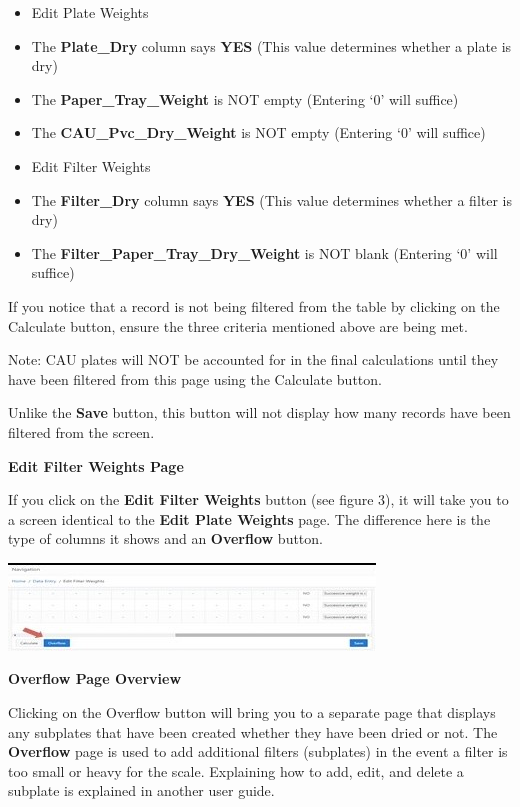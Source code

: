 \documentclass[
]{book}
\begin{document}
\begin{itemize}
\item
  Edit Plate Weights\\
\item
  The \textbf{Plate\_Dry} column says \textbf{YES} (This value determines whether a plate is dry)\\
\item
  The \textbf{Paper\_Tray\_Weight} is NOT empty (Entering `0' will suffice)\\
\item
  The \textbf{CAU\_Pvc\_Dry\_Weight} is NOT empty (Entering `0' will suffice)
\item
  Edit Filter Weights\\
\item
  The \textbf{Filter\_Dry} column says \textbf{YES} (This value determines whether a filter is dry)\\
\item
  The \textbf{Filter\_Paper\_Tray\_Dry\_Weight} is NOT blank (Entering `0' will suffice)
\end{itemize}

If you notice that a record is not being filtered from the table by clicking on the Calculate button, ensure the three criteria mentioned above are being met.

Note: CAU plates will NOT be accounted for in the final calculations until they have been filtered from this page using the Calculate button.

Unlike the \textbf{Save} button, this button will not display how many records have been filtered from the screen.

\textbf{Edit Filter Weights Page}

If you click on the \textbf{Edit Filter Weights} button (see figure 3), it will take you to a screen identical to the \textbf{Edit Plate Weights} page. The difference here is the type of columns it shows and an \textbf{Overflow} button.

\includegraphics{images/Data5.jpg}

\textbf{Overflow Page Overview}

Clicking on the Overflow button will bring you to a separate page that displays any subplates that have been created whether they have been dried or not. The \textbf{Overflow} page is used to add additional filters (subplates) in the event a filter is too small or heavy for the scale. Explaining how to add, edit, and delete a subplate is explained in another user guide.
\end{document}
